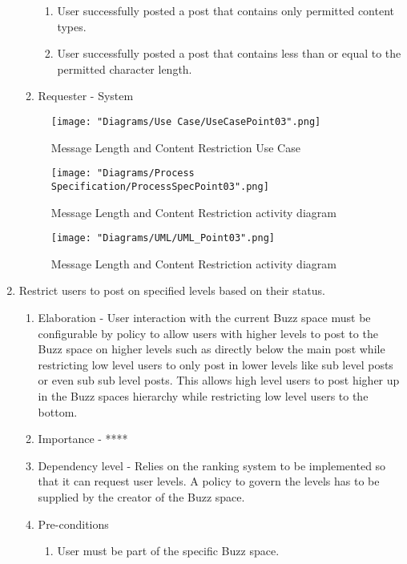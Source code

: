 \documentclass[12pt]{article}
\begin{document}
\begin{enumerate}
\begin{enumerate}
    \begin{enumerate}
    	\item User successfully posted a post that contains only permitted content types.
    	\item User successfully posted a post that contains less than or equal to the permitted character length.
    \end{enumerate}
    \item Requester - System
  \end{enumerate}
\begin{figure}[h]
  	\centering
  	\texttt{[image: "Diagrams/Use Case/UseCasePoint03".png]}
  	\caption{Message Length and Content Restriction Use Case}
  \end{figure}
  \begin{figure}[h]
  		\centering
  		\texttt{[image: "Diagrams/Process Specification/ProcessSpecPoint03".png]}
  		\caption{Message Length and Content Restriction activity diagram}
  	\end{figure}
	\begin{figure}[h]
  		\centering
  		\texttt{[image: "Diagrams/UML/UML\_Point03".png]}
  		\caption{Message Length and Content Restriction activity diagram}
  	\end{figure}
\clearpage %
   \item Restrict users to post on specified levels based on their status. %
  \begin{enumerate}
    \item Elaboration - User interaction with the current Buzz space must be configurable by policy to allow users with higher levels to post to the Buzz space on higher levels such as directly below the main post while restricting low level users to only post in lower levels like sub level posts or even sub sub level posts. This allows high level users to post higher up in the Buzz spaces hierarchy while restricting low level users to the bottom. 
    \item Importance - ****
    \item Dependency level - Relies on the ranking system to be implemented so that it can request user levels. A policy to govern the levels has to be supplied by the creator of the Buzz space.
    \item Pre-conditions
    \begin{enumerate}
    	\item User must be part of the specific Buzz space.

\end{enumerate}
\end{enumerate}
\end{enumerate}
\end{document}
